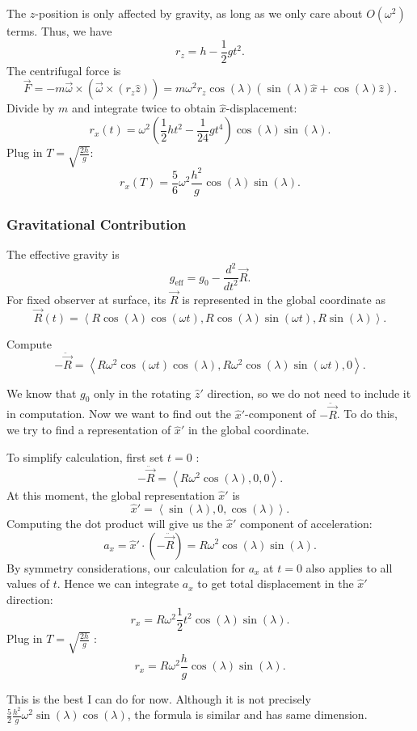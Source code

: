 The $z$-position is only affected by gravity, as long as we only care about $O(\omega^2)$ terms. Thus, we have
\[
	r_z = h - \frac{1}{2} g t^2
.\] 
The centrifugal force is
\[
	\vec{F} = - m \vec{\omega}  \times (\vec{\omega} \times \left( r_z \hat{z}  \right) )
	= m \omega^2 r_z \cos(\lambda)\left( \sin (\lambda) \hat{x}  + \cos(\lambda) \hat{z}  \right) 
.\] 
Divide by $m$ and integrate twice to obtain $\hat{x} $-displacement:
\[
	r_x(t) = \omega^2 (\frac{1}{2} h t^2 - \frac{1}{24} g t^4) \cos(\lambda) \sin(\lambda)
.\] 
Plug in $T = \sqrt{\frac{2 h}{g}} $:
\[
	r_x(T) = \frac{5}{6} \omega^2 \frac{h^2}{g} \cos(\lambda) \sin(\lambda)
.\] 

\subsubsection{Gravitational Contribution}
The effective gravity is
\[
	g_{\text{eff}} = g_0 - \frac{d ^2}{dt^2}\vec{R}
.\] 
For fixed observer at surface, its $\vec{R} $ is represented in the global coordinate as
\[
	\vec{R} (t) = \left\langle R \cos(\lambda) \cos(\omega t), R \cos(\lambda) \sin(\omega t) , R \sin(\lambda) \right\rangle 
.\] 

Compute
\[
	-\ddot{\vec{R} } = \left\langle R \omega^2 \cos(\omega t) \cos(\lambda), R \omega^2 \cos(\lambda) \sin(\omega t), 0 \right\rangle 
.\] 

We know that $g_0$ only in the rotating $\hat{z}' $ direction, so we do not need to include it in computation. Now we want to find out the $\hat{x} '$-component of $- \ddot{\vec{R} }$. To do this, we try to find a representation of $\hat{x} '$ in the global coordinate.

To simplify calculation, first set $t = 0$ :
\[
	- \ddot{\vec{R} } = \left\langle R \omega^2 \cos(\lambda), 0, 0 \right\rangle 
.\] 
At this moment, the global representation $\hat{x} '$ is
\[
	\hat{x} ' = \left\langle \sin(\lambda), 0, \cos(\lambda) \right\rangle 
.\] 
Computing the dot product will give us the $\hat{x} '$ component of acceleration:
\[
	a_x = \hat{x} ' \cdot (- \ddot{\vec{R} }) = R \omega^2 \cos(\lambda) \sin(\lambda)
.\] 
By symmetry considerations, our calculation for $a_x$ at $t=0$ also applies to all values of $t$. Hence we can integrate $a_x$ to get total displacement in the $\hat{x} '$ direction:
\[
	r_x = R \omega^2 \frac{1}{2}t^2 \cos(\lambda) \sin(\lambda)
.\] 
Plug in $T = \sqrt{\frac{2h}{g}} $ :
\[
	r_x = R \omega^2 \frac{h}{g} \cos(\lambda) \sin(\lambda)
.\] 

This is the best I can do for now. Although it is not precisely $\frac{5}{2} \frac{h^2}{g} \omega^2 \sin(\lambda) \cos(\lambda)$, the formula is similar and has same dimension.
